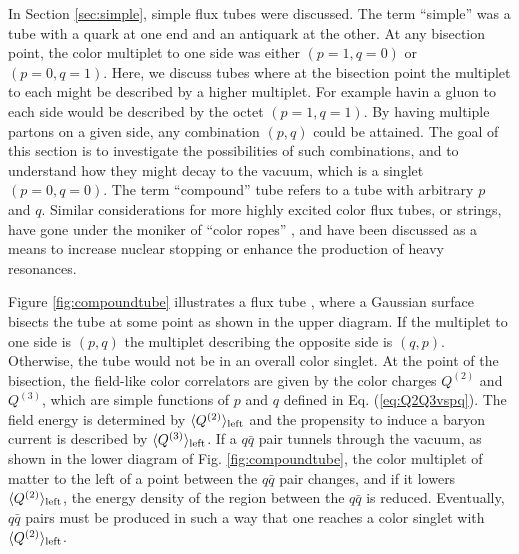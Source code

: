 \documentclass[aps, prc, 12pt, nofootinbib, showpacs, superscriptaddress, tightenlines, groupedaddress]{revtex4-2}
\begin{document}
In Section \ref{sec:simple}, simple flux tubes were discussed. The term ``simple'' was a tube with a quark at one end and an antiquark at the other. At any bisection point, the color multiplet to one side was either $(p=1,q=0)$ or $(p=0,q=1)$. Here, we discuss tubes where at the bisection point the multiplet to each might be described by a higher multiplet. For example havin a gluon to each side would be described by the octet $(p=1,q=1)$. By having multiple partons on a given side, any combination $(p,q)$ could be attained. The goal of this section is to investigate the possibilities of such combinations, and to understand how they might decay to the vacuum, which is a singlet $(p=0,q=0)$. The term ``compound'' tube refers to a tube with arbitrary $p$ and $q$. Similar considerations for more highly excited color flux tubes, or strings, have gone under the moniker of ``color ropes'' \cite{Sorge:1995dp,Bierlich:2014xba,Goswami:2019mta,Andersson:1991er}, and have been discussed as a means to increase nuclear stopping or enhance the production of heavy resonances.

Figure \ref{fig:compoundtube} illustrates a flux tube , where a Gaussian surface bisects the tube at some point as shown in the upper diagram. If the multiplet to one side is $(p,q)$ the multiplet describing the opposite side is $(q,p)$. Otherwise, the tube would not be in an overall color singlet. At the point of the bisection, the field-like color correlators are given by the color charges $Q^{(2)}$ and $Q^{(3)}$, which are simple functions of $p$ and $q$ defined in Eq. (\ref{eq:Q2Q3vspq}). The field energy is determined by $\langle Q^{(2)}\rangle_{\rm left}$ and the propensity to induce a baryon current is described by $\langle Q^{(3)}\rangle_{\rm left}$. If a $q\bar{q}$ pair tunnels through the vacuum, as shown in the lower diagram of Fig. \ref{fig:compoundtube}, the color multiplet of matter to the left of a point between the $q\bar{q}$ pair changes, and if it lowers $\langle Q^{(2)}\rangle_{\rm left}$, the energy density of the region between the $q\bar{q}$ is reduced. Eventually, $q\bar{q}$ pairs must be produced in such a way that one reaches a color singlet with $\langle Q^{(2)}\rangle_{\rm left}$.
\end{document}
